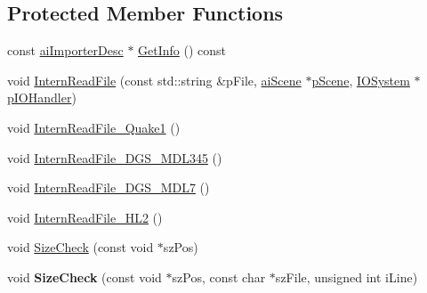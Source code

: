\subsection*{Protected Member Functions}
\begin{DoxyCompactItemize}
\item 
const \hyperlink{structai_importer_desc}{ai\+Importer\+Desc} $\ast$ \hyperlink{class_assimp_1_1_m_d_l_importer_a1295d9d6840c9a563866bc3ac8acc22d}{Get\+Info} () const 
\item 
void \hyperlink{class_assimp_1_1_m_d_l_importer_ab95ee90a0d1724dc4876383a782716e1}{Intern\+Read\+File} (const std\+::string \&p\+File, \hyperlink{structai_scene}{ai\+Scene} $\ast$\hyperlink{class_assimp_1_1_m_d_l_importer_a7c9f90a45d7a42bfc37d53bd8d7452e8}{p\+Scene}, \hyperlink{class_assimp_1_1_i_o_system}{I\+O\+System} $\ast$\hyperlink{class_assimp_1_1_m_d_l_importer_a5799905b6ba533b0f066684b859bc3d5}{p\+I\+O\+Handler})
\item 
void \hyperlink{class_assimp_1_1_m_d_l_importer_a600e7f165003c7f5b0314eb685a3d883}{Intern\+Read\+File\+\_\+\+Quake1} ()
\item 
void \hyperlink{class_assimp_1_1_m_d_l_importer_a374daf0faf9619426f4da82e867cb6c5}{Intern\+Read\+File\+\_\+D\+G\+S\+\_\+\+M\+D\+L345} ()
\item 
void \hyperlink{class_assimp_1_1_m_d_l_importer_a70b64e8b3295003cb86e7703ed23d9cb}{Intern\+Read\+File\+\_\+D\+G\+S\+\_\+\+M\+D\+L7} ()
\item 
void \hyperlink{class_assimp_1_1_m_d_l_importer_a636725add7ee757368721d5359c1ba38}{Intern\+Read\+File\+\_\+\+H\+L2} ()
\item 
void \hyperlink{class_assimp_1_1_m_d_l_importer_a02b131e58eb34cde491791fe32b9be3a}{Size\+Check} (const void $\ast$sz\+Pos)
\item 
\hypertarget{class_assimp_1_1_m_d_l_importer_a564286b6cddd58d819872e0ecedeb3ff}{void {\bfseries Size\+Check} (const void $\ast$sz\+Pos, const char $\ast$sz\+File, unsigned int i\+Line)}\label{class_assimp_1_1_m_d_l_importer_a564286b6cddd58d819872e0ecedeb3ff}


\end{DoxyCompactItemize}
